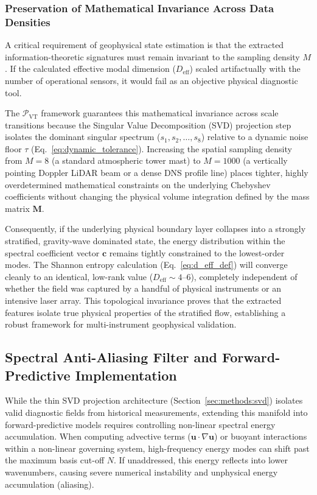 \documentclass[11pt,a4paper]{article}
\begin{document}
\subsubsection{Preservation of Mathematical Invariance Across Data Densities}
\label{sec:extensions:invariance}

A critical requirement of geophysical state estimation is that the extracted information-theoretic signatures must remain invariant to the sampling density $M$. If the calculated effective modal dimension ($D_{\mathrm{eff}}$) scaled artifactually with the number of operational sensors, it would fail as an objective physical diagnostic tool.

The $\mathcal{P}_{\mathrm{VT}}$ framework guarantees this mathematical invariance across scale transitions because the Singular Value Decomposition (SVD) projection step isolates the dominant singular spectrum ($s_1, s_2, \dots, s_8$) relative to a dynamic noise floor $\tau$ (Eq.~\ref{eq:dynamic_tolerance}). Increasing the spatial sampling density from $M = 8$ (a standard atmospheric tower mast) to $M = 1000$ (a vertically pointing Doppler LiDAR beam or a dense DNS profile line) places tighter, highly overdetermined mathematical constraints on the underlying Chebyshev coefficients without changing the physical volume integration defined by the mass matrix $\mathbf{M}$.

Consequently, if the underlying physical boundary layer collapses into a strongly stratified, gravity-wave dominated state, the energy distribution within the spectral coefficient vector $\mathbf{c}$ remains tightly constrained to the lowest-order modes. The Shannon entropy calculation (Eq.~\ref{eq:d_eff_def}) will converge cleanly to an identical, low-rank value ($D_{\mathrm{eff}} \sim 4$--$6$), completely independent of whether the field was captured by a handful of physical instruments or an intensive laser array. This topological invariance proves that the extracted features isolate true physical properties of the stratified flow, establishing a robust framework for multi-instrument geophysical validation.

\subsection{Spectral Anti-Aliasing Filter and Forward-Predictive Implementation}
\label{sec:extensions:antialiasing}

While the thin SVD projection architecture (Section~\ref{sec:methods:svd}) isolates valid diagnostic fields from historical measurements, extending this manifold into forward-predictive models requires controlling non-linear spectral energy accumulation. When computing advective terms ($\mathbf{u} \cdot \nabla \mathbf{u}$) or buoyant interactions within a non-linear governing system, high-frequency energy modes can shift past the maximum basis cut-off $N$. If unaddressed, this energy reflects into lower wavenumbers, causing severe numerical instability and unphysical energy accumulation (aliasing).
\end{document}

